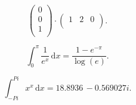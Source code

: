 

  \[ 
  \begin{pmatrix}
  0\\
  0\\
  1\\
  \end{pmatrix} \cdot \begin{pmatrix}
  1 & 2 & 0\\
  \end{pmatrix}
  .\]
  
  \[ 
  \int_{0}^{\pi} \frac{1}{e^{x}} \, \mathrm{d}x  = \frac{1-e^{-\pi }}{\log (e)}
  .\]
  
  \[ 
  \int_{-Pi}^{Pi}  x^{x} \, \mathrm{d}x = 18.8936\, -0.569027 i
  .\]
  
